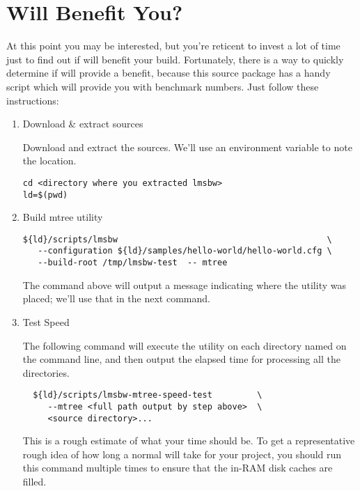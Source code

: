 \section{Will \lmsbw Benefit You?}

At this point you may be interested, but you're reticent to invest a
lot of time just to find out if \lmsbw will benefit your build.
Fortunately, there is a way to quickly determine if \lmsbw will
provide a benefit, because this source package has a handy script
which will provide you with benchmark numbers.  Just follow these
instructions:

\begin{enumerate}
\item Download \& extract \lmsbw sources

  Download and extract the sources.  We'll use an environment variable
  to note the location.

\begin{verbatim}
cd <directory where you extracted lmsbw>
ld=$(pwd)
\end{verbatim}
\item Build mtree utility
\begin{verbatim}
${ld}/scripts/lmsbw                                          \
   --configuration ${ld}/samples/hello-world/hello-world.cfg \
   --build-root /tmp/lmsbw-test  -- mtree
\end{verbatim}

The command above will output a message indicating where the \mtree
utility was placed; we'll use that in the next command.

\item Test Speed

  The following command will execute the \mtree utility on each
  directory named on the command line, and then output the elapsed
  time for processing all the directories.

\begin{verbatim}
  ${ld}/scripts/lmsbw-mtree-speed-test         \
     --mtree <full path output by step above>  \
     <source directory>...
\end{verbatim}

This is a rough estimate of what your \nullbuild time should be.  To
get a representative rough idea of how long a normal \nullbuild will
take for your project, you should run this command multiple times to
ensure that the in-RAM disk caches are filled.

\end{enumerate}

